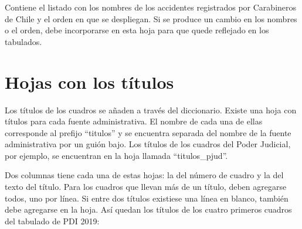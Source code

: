 \documentclass[
  spanish,
]{book}
\begin{document}
Contiene el listado con los nombres de los accidentes registrados por Carabineros de Chile y el orden en que se despliegan. Si se produce un cambio en los nombres o el orden, debe incorporarse en esta hoja para que quede reflejado en los tabulados.

\hypertarget{hojas-con-los-tuxedtulos}{%
\section{Hojas con los títulos}\label{hojas-con-los-tuxedtulos}}

Los títulos de los cuadros se añaden a través del diccionario. Existe una hoja con títulos para cada fuente administrativa. El nombre de cada una de ellas corresponde al prefijo ``titulos'' y se encuentra separada del nombre de la fuente administrativa por un guión bajo. Los títulos de los cuadros del Poder Judicial, por ejemplo, se encuentran en la hoja llamada ``titulos\_pjud''.

Dos columnas tiene cada una de estas hojas: la del número de cuadro y la del texto del título. Para los cuadros que llevan más de un título, deben agregarse todos, uno por línea. Si entre dos títulos existiese una línea en blanco, también debe agregarse en la hoja. Así quedan los títulos de los cuatro primeros cuadros del tabulado de PDI 2019:
\end{document}

